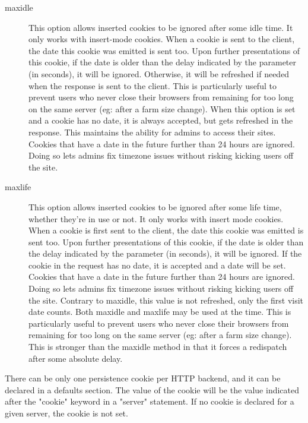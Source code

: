 \begin{description}
  \item[maxidle]   This option allows inserted cookies to be ignored after some idle
              time. It only works with insert-mode cookies. When a cookie is
              sent to the client, the date this cookie was emitted is sent too.
              Upon further presentations of this cookie, if the date is older
              than the delay indicated by the parameter (in seconds), it will
              be ignored. Otherwise, it will be refreshed if needed when the
              response is sent to the client. This is particularly useful to
              prevent users who never close their browsers from remaining for
              too long on the same server (eg: after a farm size change). When
              this option is set and a cookie has no date, it is always
              accepted, but gets refreshed in the response. This maintains the
              ability for admins to access their sites. Cookies that have a
              date in the future further than 24 hours are ignored. Doing so
              lets admins fix timezone issues without risking kicking users off
              the site.

  \item[maxlife]   This option allows inserted cookies to be ignored after some life
              time, whether they're in use or not. It only works with insert
              mode cookies. When a cookie is first sent to the client, the date
              this cookie was emitted is sent too. Upon further presentations
              of this cookie, if the date is older than the delay indicated by
              the parameter (in seconds), it will be ignored. If the cookie in
              the request has no date, it is accepted and a date will be set.
              Cookies that have a date in the future further than 24 hours are
              ignored. Doing so lets admins fix timezone issues without risking
              kicking users off the site. Contrary to maxidle, this value is
              not refreshed, only the first visit date counts. Both maxidle and
              maxlife may be used at the time. This is particularly useful to
              prevent users who never close their browsers from remaining for
              too long on the same server (eg: after a farm size change). This
              is stronger than the maxidle method in that it forces a
              redispatch after some absolute delay.
  \end{description}

  There can be only one persistence cookie per HTTP backend, and it can be
  declared in a defaults section. The value of the cookie will be the value
  indicated after the "cookie" keyword in a "server" statement. If no cookie
  is declared for a given server, the cookie is not set.

